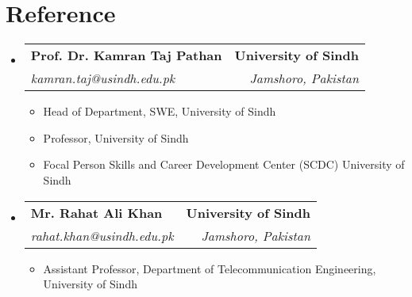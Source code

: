 \documentclass[letterpaper,11pt]{article}
\makeatletter
\newcommand{\resumeItem}[1]{
  \item\small{
    {#1 \vspace{-2pt}}
  }
}
\newcommand{\resumeSubheading}[4]{
  \vspace{-2pt}\item
    \begin{tabular*}{1.0\textwidth}[t]{l@{\extracolsep{\fill}}r}
      \textbf{#1} & \textbf{\small #2} \\
      \textit{\small#3} & \textit{\small #4} \\
    \end{tabular*}\vspace{-7pt}
}
\newcommand{\resumeSubHeadingListStart}{\begin{itemize}[leftmargin=0.0in, label={}]}
\newcommand{\resumeSubHeadingListEnd}{\end{itemize}}
\newcommand{\resumeItemListStart}{\begin{itemize}}
\newcommand{\resumeItemListEnd}{\end{itemize}\vspace{-5pt}}
\makeatother
\begin{document}
\section{Reference}
  \resumeSubHeadingListStart
    \resumeSubheading
      {Prof. Dr. Kamran Taj Pathan}{University of Sindh}
      {kamran.taj@usindh.edu.pk}{Jamshoro, Pakistan}
      \resumeItemListStart
        \resumeItem{Head of Department, SWE, University of Sindh}
        \resumeItem{Professor, University of Sindh}
        \resumeItem{Focal Person Skills and Career Development Center (SCDC) University of Sindh}
      \resumeItemListEnd
      
    \resumeSubheading
      {Mr. Rahat Ali Khan}{University of Sindh}
      {rahat.khan@usindh.edu.pk}{Jamshoro, Pakistan}
      \resumeItemListStart
        \resumeItem{Assistant Professor, Department of Telecommunication Engineering, University of Sindh}
      \resumeItemListEnd
  \resumeSubHeadingListEnd



        
\end{document}
